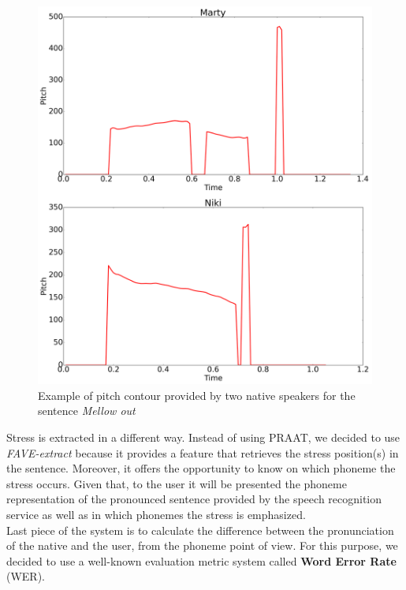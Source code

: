 \begin{figure}[!ht]
	\centering
	\includegraphics[scale=0.15]{Figures/pitch_native.png}
	\caption{Example of pitch contour provided by two native speakers for the sentence \textit{Mellow out}}
	\label{fig:pitch_native}
\end{figure}

\noindent Stress is extracted in a different way. Instead of using PRAAT, we decided to use \textit{FAVE-extract} because it provides a feature that retrieves the stress position(s) in the sentence. Moreover, it offers the opportunity to know on which phoneme the stress occurs. Given that, to the user it will be presented the phoneme representation of the pronounced sentence provided by the speech recognition service as well as in which phonemes the stress is emphasized. \\

\noindent Last piece of the system is to calculate the difference between the pronunciation of the native and the user, from the phoneme point of view. For this purpose, we decided to use a well-known evaluation metric system called \textbf{Word Error Rate} (WER). \\

